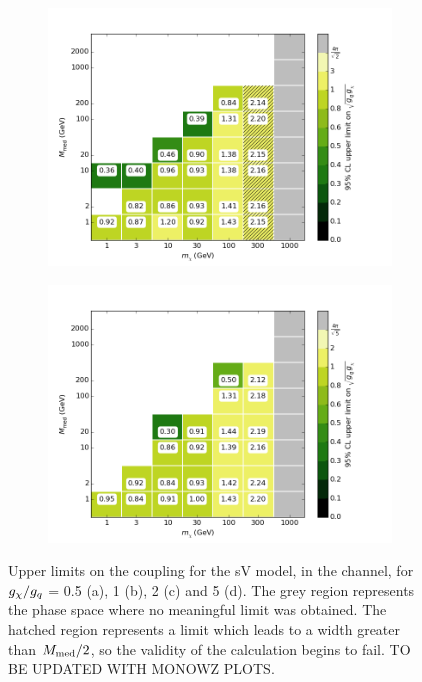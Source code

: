 \begin{figure}[h]
\begin{subfigure}[t]{0.45\textwidth}
      \includegraphics[width=1.\textwidth]{figures/grid_allpoints_SVD_rat2.png}
      \caption{}
    \end{subfigure}
    \begin{subfigure}[t]{0.45\textwidth}
      \centering
      \includegraphics[width=1.\textwidth]{figures/grid_allpoints_SVD_rat5.png}
      \caption{}
    \end{subfigure}
    \caption{Upper limits on the coupling for the sV model, in the \monoWZ channel, for $g_{\chi} / g_q$ = 0.5 (a), 1 (b), 2 (c) and 5 (d). The grey region represents the phase space where no meaningful limit was obtained. The hatched region represents a limit which leads to a width greater than $M_{\mathrm{med}} / 2$, so the validity of the calculation begins to fail. TO BE UPDATED WITH MONOWZ PLOTS.}
    \label{fig:MonoWZ_SVD_couplinglimit}
\end{figure}

